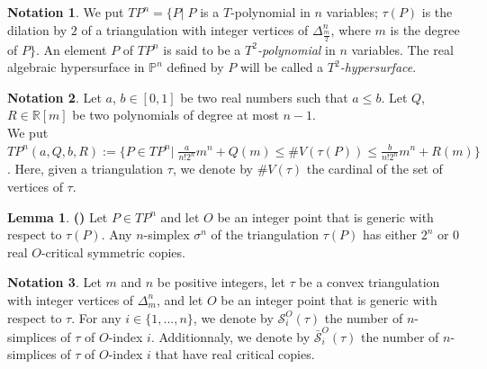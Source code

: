 \documentclass[12pt]{article}
\renewcommand{\P}{\mathbb{P}}
\theoremstyle{definition}
\newtheorem{lem}{Lemma}[section]
\newtheorem{nota}{Notation}[section]
\begin{document}
\begin{nota}
    We put $TP^n = \{ P| \;P$ is a $T$-polynomial in $n$ variables; $\tau(P)$ is the dilation by $2$ of a triangulation with integer vertices of $\Delta_{\frac{m}{2}}^n$, where $m$ is the degree of $P \}$. An element $P$ of $TP^n$ is said to be a $T^2$\textit{-polynomial} in $n$ variables. The real algebraic hypersurface in $\P^n$ defined by $P$ will be called a $T^2$\textit{-hypersurface}.
\end{nota}

\begin{nota}
    Let $a$, $b \in [0,1]$ be two real numbers such that $a \leq b$. Let $Q$, $R \in \mathbb{R}[m]$ be two polynomials of degree at most $n-1$.\\ 
    We put $TP^n(a,Q,b,R) := \{ P \in TP^n |\; \frac{a}{n!2^n}m^n + Q(m) \leq \#V(\tau(P)) \leq \frac{b}{n!2^n}m^n + R(m)\}$. Here, given a triangulation $\tau$, we denote by $\#V(\tau)$ the cardinal of the set of vertices of $\tau$.
\end{nota}


\begin{lem}
    \textbf{(\cite{itenbergshustincritpts})} Let $P\in TP^n$ and let $O$ be an integer point that is generic with respect to $\tau(P)$. Any $n$-simplex $\sigma^n$ of the triangulation $\tau(P)$ has either $2^n$ or $0$ real $O$-critical symmetric copies.
\end{lem}

\begin{nota}
    Let $m$ and $n$ be positive integers, let $\tau$ be a convex triangulation with integer vertices of $\Delta_m^n$, and let $O$ be an integer point that is generic with respect to $\tau$. For any $i \in \{1,...,n \}$, we denote by $\mathcal{S}^O_i(\tau)$ the number of $n$-simplices of $\tau$ of $O$-index $i$. Additionnaly, we denote by $\bar{\mathcal{S}}_i^O(\tau)$ the number of $n$-simplices of $\tau$ of $O$-index $i$ that have real critical copies.
\end{nota}
\end{document}
